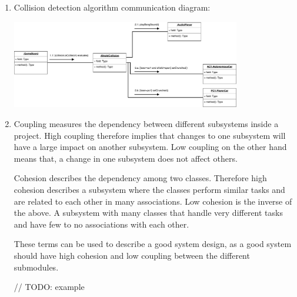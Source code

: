 \documentclass[a4paper, 10pt]{article}
\begin{document}
\begin{enumerate}
    \item Collision detection algorithm communication diagram:

    \includegraphics[width=10cm]{CommunicationDiagram.pdf}

    \item 
        Coupling measures the dependency between different subsystems inside a project.
        High coupling therefore implies that changes to one subsystem will have a large impact on 
        another subsystem.
        Low coupling on the other hand means that, a change in one subsystem does not affect others. 

        Cohesion describes the dependency among two classes. 
        Therefore high cohesion describes a subsystem where the classes perform similar tasks and 
        are related to each other in many associations.
        Low cohesion is the inverse of the above. A subsystem with many classes that handle very different
        tasks and have few to no associations with each other.

        These terms can be used to describe a good system design, as a good system should have 
        high cohesion and low coupling between the different submodules.

        // TODO: example
\end{enumerate}
\end{document}
